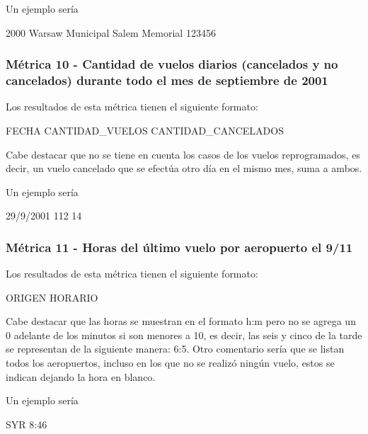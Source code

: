 \documentclass[a4paper,10pt]{article}
\begin{document}
            Un ejemplo sería\\
            \begin{center}
                2000  Warsaw Municipal  Salem Memorial  123456\\
            \end{center}

 \subsubsection{Métrica 10 - Cantidad de vuelos diarios (cancelados y no cancelados) durante todo el mes de septiembre de 2001}
            Los resultados de esta métrica tienen el siguiente formato:\\
            \begin{center}
                FECHA CANTIDAD\_VUELOS  CANTIDAD\_CANCELADOS
            \end{center}
            Cabe destacar que no se tiene en cuenta los casos de los vuelos reprogramados, es decir, un vuelo cancelado que se efectúa otro día en el mismo mes, suma a ambos.

            Un ejemplo sería\\
            \begin{center}
                29/9/2001  112  14\\
            \end{center}

 \subsubsection{Métrica 11 - Horas del último vuelo por aeropuerto el 9/11}
            Los resultados de esta métrica tienen el siguiente formato:\\
            \begin{center}
                ORIGEN HORARIO
            \end{center}
            Cabe destacar que las horas se muestran en el formato h:m pero no se agrega un 0 adelante de los minutos si son menores a 10, es decir, las seis y cinco de la tarde se representan de la siguiente manera: 6:5. Otro comentario sería que se listan todos los aeropuertos, incluso en los que no se realizó ningún vuelo, estos se indican dejando la hora en blanco.

            Un ejemplo sería\\
            \begin{center}
                SYR  8:46\\
            \end{center}
\end{document}
